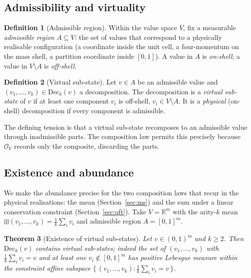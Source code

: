 \documentclass[11pt,a4paper]{article}
\theoremstyle{thmstyle}
\newtheorem{theorem}{Theorem}[section]
\theoremstyle{definition}
\newtheorem{definition}[theorem]{Definition}
\theoremstyle{remark}
\newcommand{\R}{\mathbb{R}}
\newcommand{\Obs}{\mathcal{O}}
\begin{document}
\subsection{Admissibility and virtuality}
\label{sec:admissibility}

\begin{definition}[Admissible region]
\label{def:admissible}
Within the value space $V$, fix a measurable \emph{admissible region}
$A\subseteq V$: the set of values that correspond to a physically
realisable configuration (a coordinate inside the unit cell, a four-momentum
on the mass shell, a partition coordinate inside $[0,1]$). A value in $A$
is \emph{on-shell}; a value in $V\setminus A$ is \emph{off-shell}.
\end{definition}

\begin{definition}[Virtual sub-state]
\label{def:virtual}
Let $v\in A$ be an admissible value and $(v_1,\dots,v_k)\in\mathrm{Dec}_k(v)$
a decomposition. The decomposition is a \emph{virtual sub-state} of $v$ if
at least one component $v_i$ is off-shell, $v_i\in V\setminus A$. It is a
\emph{physical} (on-shell) decomposition if every component is admissible.
\end{definition}

The defining tension is that a virtual sub-state recomposes to an
admissible value through inadmissible parts. The composition law permits
this precisely because $\Obs_V$ records only the composite, discarding the
parts.

\subsection{Existence and abundance}
\label{sec:abundance}

We make the abundance precise for the two composition laws that recur in
the physical realisations: the mean (Section~\ref{sec:ms}) and the sum
under a linear conservation constraint (Section~\ref{sec:qft}). Take
$V=\R^m$ with the arity-$k$ mean
$\boxplus(v_1,\dots,v_k)=\tfrac{1}{k}\sum_i v_i$ and admissible region
$A=[0,1]^m$.

\begin{theorem}[Existence of virtual sub-states]
\label{thm:virtualexist}
Let $v\in (0,1)^m$ and $k\geq 2$. Then $\mathrm{Dec}_k(v)$ contains
virtual sub-states; indeed the set of $(v_1,\dots,v_k)$ with
$\tfrac1k\sum_i v_i=v$ and at least one $v_i\notin[0,1]^m$ has positive
Lebesgue measure within the constraint affine subspace
$\{\,(v_1,\dots,v_k):\tfrac1k\sum_i v_i=v\,\}$.
\end{theorem}
\end{document}
